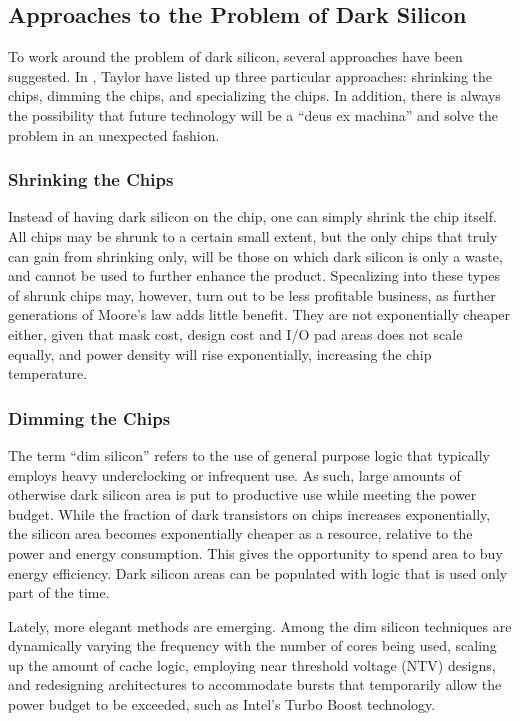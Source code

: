 \subsection{Approaches to the Problem of Dark Silicon}
\label{sec:taylor}

To work around the problem of dark silicon, several approaches have been suggested.
In \cite{dark-silicon}, Taylor have listed up three particular approaches: shrinking the chips, dimming the chips, and specializing the chips.
In addition, there is always the possibility that future technology will be a ``deus ex machina'' and solve the problem in
an unexpected fashion.

\subsubsection{Shrinking the Chips}

Instead of having dark silicon on the chip, one can simply shrink the chip itself.
All chips may be shrunk to a certain small extent, but the only chips that truly can gain from shrinking only, will be those on which dark silicon is only a waste, and cannot be used to further enhance the product.   
Specalizing into these types of shrunk chips may, however, turn out to be less profitable business, as further generations of Moore's law adds little benefit. 
They are not exponentially cheaper either, given that mask cost, design cost and I/O pad areas does not scale equally, and power density will rise exponentially, increasing the chip temperature.

\subsubsection{Dimming the Chips}
The term ``dim silicon'' refers to the use of general purpose logic that typically employs heavy underclocking or infrequent use.
As such, large amounts of otherwise dark silicon area is put to productive use while meeting the power budget.
While the fraction of dark transistors on chips increases exponentially, the silicon area becomes exponentially cheaper
as a resource, relative to the power and energy consumption. This gives the opportunity to spend area to buy energy efficiency.
Dark silicon areas can be populated with logic that is used only part of the time.

Lately, more elegant methods are emerging. Among the dim silicon techniques are dynamically varying the frequency with the
number of cores being used, scaling up the amount of cache logic, employing near threshold voltage (NTV) designs, and redesigning
architectures to accommodate bursts that temporarily allow the power budget to be exceeded, such as Intel's Turbo Boost technology. \cite{dark-silicon}

